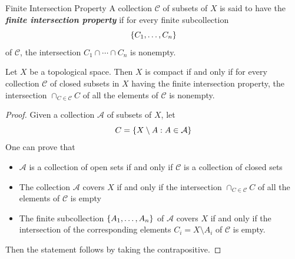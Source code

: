 \documentclass[12pt,a4paper]{article}
\begin{document}
    \begin{defi}{Finite Intersection Property}
        A collection $\mathcal{C}$ of subsets of $X$ is said to have the \textbf{\textit{finite intersection property}} if for every finite subcollection
        $$
        \left\{C_1,\dots,C_n\right\}
        $$
        of $\mathcal{C}$, the intersection $C_1\cap\cdots\cap C_n$ is nonempty.
    \end{defi}
    \begin{thm}\label{3.4.12}
        Let $X$ be a topological space. Then $X$ is compact if and only if for every collection $\mathcal{C}$ of closed subsets in $X$ having the finite intersection property, the intersection $\cap_{C\in\mathcal{C}}C$ of all the elements of $\mathcal{C}$ is nonempty.
    \end{thm}
    \begin{proof}
        Given a collection $\mathcal{A}$ of subsets of $X$, let
        $$
        C=\left\{X\setminus A:A\in\mathcal{A}\right\}
        $$
        One can prove that
        \begin{itemize}
            \item $\mathcal{A}$ is a collection of open sets if and only if $\mathcal{C}$ is a collection of closed sets
            \item The collection $\mathcal{A}$ covers $X$ if and only if the intersection $\cap_{C\in\mathcal{C}}C$ of all the elements of $\mathcal{C}$ is empty
            \item The finite subcollection $\left\{A_1,\dots,A_n\right\}$ of $\mathcal{A}$ covers $X$ if and only if the intersection of the corresponding elements $C_i=X\setminus A_i$ of $\mathcal{C}$ is empty.
        \end{itemize}
        Then the statement follows by taking the contrapositive.
    \end{proof}
    \hfill
\end{document}
